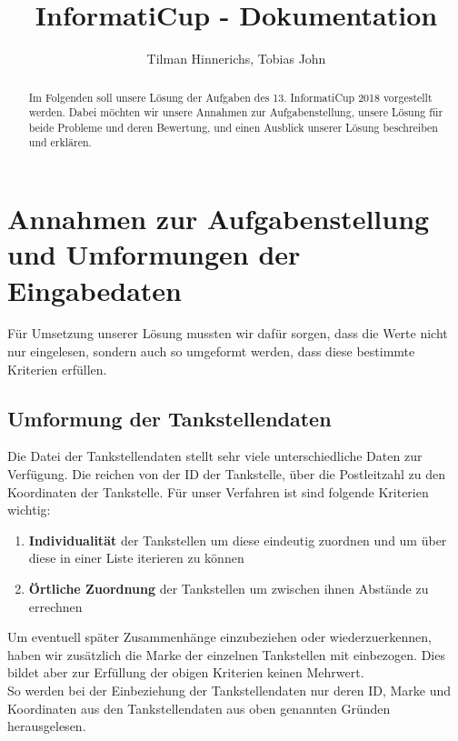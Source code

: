 \documentclass[11pt]{article}
\title{InformatiCup - Dokumentation}
\author{Tilman Hinnerichs, Tobias John}
\begin{document}
\maketitle

\begin{abstract}
	Im Folgenden soll unsere Lösung der Aufgaben des 13. InformatiCup 2018 vorgestellt werden. Dabei möchten wir unsere Annahmen zur Aufgabenstellung, unsere Lösung für beide Probleme und deren Bewertung, und einen Ausblick unserer Lösung beschreiben und erklären.  
\end{abstract}

\section{Annahmen zur Aufgabenstellung und Umformungen der Eingabedaten}
	Für Umsetzung unserer Lösung mussten wir dafür sorgen, dass die Werte nicht nur eingelesen, sondern auch so umgeformt werden, dass diese bestimmte Kriterien erfüllen.  
\subsection{Umformung der Tankstellendaten}
	Die Datei der Tankstellendaten stellt sehr viele unterschiedliche Daten zur Verfügung. Die reichen von der ID der Tankstelle, über die Postleitzahl zu den Koordinaten der Tankstelle. Für unser Verfahren ist sind folgende Kriterien wichtig: \\
	\begin{enumerate}
		\item \textbf{Individualität} der Tankstellen um diese eindeutig zuordnen und um über diese in einer Liste iterieren zu können
		\item \textbf{Örtliche Zuordnung} der Tankstellen um zwischen ihnen Abstände zu errechnen
	\end{enumerate} 
	Um eventuell später Zusammenhänge einzubeziehen oder wiederzuerkennen, haben wir zusätzlich die Marke der einzelnen Tankstellen mit einbezogen. Dies bildet aber zur Erfüllung der obigen Kriterien keinen Mehrwert. \\
	So werden bei der Einbeziehung der Tankstellendaten nur deren ID, Marke und Koordinaten aus den Tankstellendaten aus oben genannten Gründen herausgelesen. 
\end{document}
